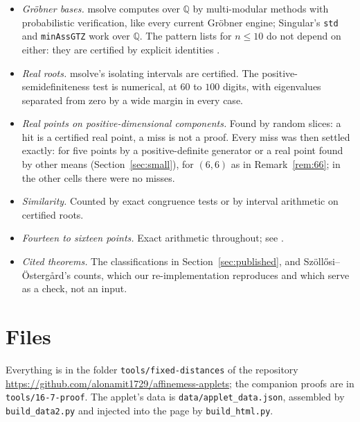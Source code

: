 \documentclass[11pt]{amsart}
\theoremstyle{remark}
\newcommand{\Q}{\mathbb{Q}}
\begin{document}
\begin{itemize}
\item \emph{Gröbner bases.} msolve computes over $\Q$ by multi-modular methods with probabilistic
  verification, like every current Gröbner engine; Singular's \texttt{std} and \texttt{minAssGTZ} work over
  $\Q$. The pattern lists for $n\le10$ do not depend on either: they are certified by explicit identities
  \cite{AC}.
\item \emph{Real roots.} msolve's isolating intervals are certified. The positive-semidefiniteness test is
  numerical, at $60$ to $100$ digits, with eigenvalues separated from zero by a wide margin in every case.
\item \emph{Real points on positive-dimensional components.} Found by random slices: a hit is a certified
  real point, a miss is not a proof. Every miss was then settled exactly: for five points by a
  positive-definite generator or a real point found by other means (Section~\ref{sec:small}), for $(6,6)$
  as in Remark~\ref{rem:66}; in the other cells there were no misses.
\item \emph{Similarity.} Counted by exact congruence tests or by interval arithmetic on certified roots.
\item \emph{Fourteen to sixteen points.} Exact arithmetic throughout; see \cite{AC,AC14}.
\item \emph{Cited theorems.} The classifications in Section~\ref{sec:published}, and Szöllősi--Östergård's
  counts, which our re-implementation reproduces and which serve as a check, not an input.
\end{itemize}

\section{Files}\label{sec:files}

Everything is in the folder \texttt{tools/fixed-distances} of the repository
\url{https://github.com/alonamit1729/affinemess-applets}; the companion proofs are in
\texttt{tools/16-7-proof}. The applet's data is \texttt{data/applet\_data.json}, assembled by
\texttt{build\_data2.py} and injected into the page by \texttt{build\_html.py}.
\end{document}
